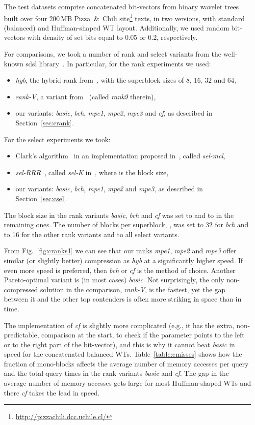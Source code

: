 \documentclass{llncs}
\begin{document}
The test datasets comprise concatenated bit-vectors from 
binary wavelet trees built over four 200\,MB Pizza~\&~Chili 
site\footnote{\url{http://pizzachili.dcc.uchile.cl/}} texts, 
in two versions, with standard (balanced) and Huffman-shaped WT layout.
Additionally, we used random bit-vectors with density of set bits 
equal to 0.05 or 0.2, respectively.


For comparisons, we took a number of rank and select variants
from the well-known sdsl library~\cite{gbmp2014sea}.
In particular, for the rank experiments we used:
\begin{itemize}
\item {\em hyb}, the hybrid rank from~\cite{KKP14}, with the 
superblock sizes of 8, 16, 32 and 64,
\item {\em rank-V}, a variant from~\cite{V08} (called {\em rank9} therein),
\item our variants: {\em basic}, {\em bch}, {\em mpe1}, {\em mpe2}, {\em mpe3} 
and {\em cf}, as described in Section~\ref{sec:crank}.
\end{itemize}
For the select experiments we took:
\begin{itemize}
\item Clark's algorithm~\cite{Clark1996} in an implementation 
proposed in~\cite{GP13}, called {\em sel-mcl}, 
\item {\em sel-RRR}~\cite{NPsea12}, called {\em sel-K} in~\cite{GP13}, 
where  is the block size, 
\item our variants: {\em basic}, {\em bch}, {\em mpe1}, {\em mpe2} and {\em mpe3}, 
as described in Section~\ref{sec:csel}.
\end{itemize}
The block size in the rank variants {\em basic}, {\em bch} and {\em cf}
was set to  and to  in the remaining ones.
The number of blocks per superblock, , was set to 32 for {\em bch} 
and to 16 for the other rank variants and to all select variants.

From Fig.~\ref{fig:cranks1} we can see that 
our ranks {\em mpe1}, {\em mpe2} and {\em mpe3} 
offer similar (or slightly better) compression as {\em hyb} 
at a significantly higher speed.
If even more speed is preferred, then {\em bch} or {\em cf} is the method of choice.
Another Pareto-optimal variant is (in most cases) {\em basic}.
Not surprisingly, the only non-compressed solution in the comparison, 
{\em rank-V}, is the fastest, yet the gap between it and the other top 
contenders is often more striking in space than in time.


The implementation of {\em cf} is slightly more complicated (e.g., 
it has the extra, non-predictable, comparison at the start, to check 
if the parameter points to the left or to the right part of the bit-vector), 
and this is why it cannot beat {\em basic} in speed for the concatenated 
balanced WTs.
Table~\ref{table:cmisses} shows how the fraction of mono-blocks  
affects the average number of memory accesses per query and the 
total query times in the rank variants {\em basic} and {\em cf}.
The gap in the average number of memory accesses gets large for most 
Huffman-shaped WTs and there {\em cf} takes the lead in speed.
\end{document}
